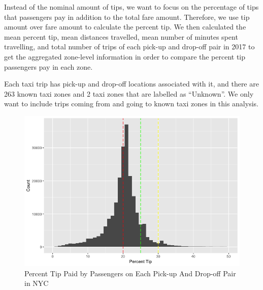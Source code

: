 \documentclass[12pt,twoside]{reedthesis}
\newenvironment{Shaded}{\begin{snugshade}}{\end{snugshade}}
\newcommand{\KeywordTok}[1]{\textcolor[rgb]{0.13,0.29,0.53}{\textbf{#1}}}
\newcommand{\DataTypeTok}[1]{\textcolor[rgb]{0.13,0.29,0.53}{#1}}
\newcommand{\DecValTok}[1]{\textcolor[rgb]{0.00,0.00,0.81}{#1}}
\newcommand{\StringTok}[1]{\textcolor[rgb]{0.31,0.60,0.02}{#1}}
\newcommand{\OperatorTok}[1]{\textcolor[rgb]{0.81,0.36,0.00}{\textbf{#1}}}
\newcommand{\NormalTok}[1]{#1}
\theoremstyle{definition}
\theoremstyle{definition}
\theoremstyle{definition}
\theoremstyle{remark}
\begin{document}
Instead of the nominal amount of tips, we want to focus on the
percentage of tips that passengers pay in addition to the total fare
amount. Therefore, we use tip amount over fare amount to calculate the
percent tip. We then calculated the mean percent tip, mean distances
travelled, mean number of minutes spent travelling, and total number of
trips of each pick-up and drop-off pair in 2017 to get the aggregated
zone-level information in order to compare the percent tip passengers
pay in each zone.
\begin{Shaded}
\end{Shaded}
Each taxi trip has pick-up and drop-off locations associated with it,
and there are 263 known taxi zones and 2 taxi zones that are labelled as
``Unknown''. We only want to include trips coming from and going to
known taxi zones in this analysis.
\begin{figure}

{\centering \includegraphics[width=5.96in]{figure/region_vis} 

}

\caption{Percent Tip Paid by Passengers on Each Pick-up And Drop-off Pair in NYC}\label{fig:region-vis}
\end{figure}
\end{document}
